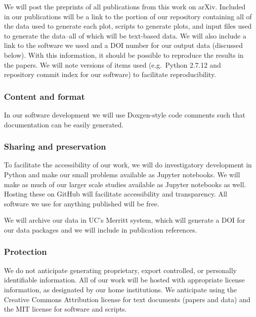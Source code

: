 \documentclass[12pt]{article}
\begin{document}
{We will post the preprints of all publications from this work on arXiv. Included in our publications will be a link to the portion of our repository containing all of the data used to generate each plot, scripts to generate plots, and input files used to generate the data--all of which will be text-based data. We will also include a link to the software we used and a DOI number for our output data (discussed below). With this information, it should be possible to reproduce the results in the papers. We will note versions of items used (e.g.\ Python 2.7.12 and repository commit index for our software) to facilitate reproducibility.\vspace{-15pt}

\subsubsection*{Content and format}\vspace{-15pt}
In our software development we will use Doxgen-style code comments such that documentation can be easily generated. 

\subsubsection*{Sharing and preservation}\vspace{-15pt}
To facilitate the accessibility of our work, we will do investigatory development in Python and make our small problems available as Jupyter notebooks. We will make as much of our larger scale studies available as Jupyter notebooks as well. Hosting these on GitHub will facilitate accessibility and transparency. All software we use for anything published will be free.
 
We will archive our data in UC's Merritt system, which will generate a DOI for our data packages and we will include in publication references.
\vspace{-15pt}

\subsubsection*{Protection}\vspace{-15pt}
We do not anticipate generating proprietary, export controlled, or personally identifiable information. All of our work will be hosted with appropriate license information, as designated by our home institutions. We anticipate using the Creative Commons Attribution license for text documents (papers and data) and the MIT license for software and scripts.
\vspace{-15pt}
 
}
\end{document}
